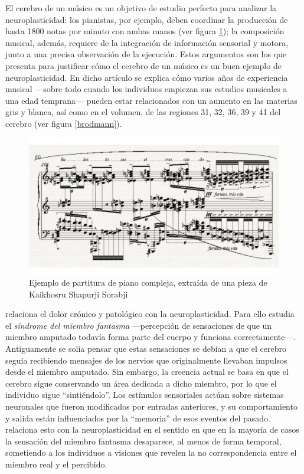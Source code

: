 El cerebro de un músico es un objetivo de estudio perfecto para analizar la neuroplasticidad: los pianistas, por ejemplo, deben coordinar la producción de hasta 1800 notas por minuto con ambas manos (ver figura \ref{fig::partitura}); la composición musical, además, requiere de la integración de información sensorial y motora, junto a una precisa observación de la ejecución. Estos argumentos son los que presenta \cite{Munte2002} para justificar cómo el cerebro de un músico es un buen ejemplo de neuroplasticidad. En dicho artículo se explica cómo varios años de experiencia musical ---sobre todo cuando los individuos empiezan sus estudios musicales a una edad temprana--- pueden estar relacionados con un aumento en las materias gris y blanca, así como en el volumen, de las regiones 31, 32, 36, 39 y 41 del cerebro (ver figura \ref{brodmann}).

\begin{figure}[h]
  \begin{center}
    \includegraphics[width=\textwidth]{images/piano.jpg}
    \caption{Ejemplo de partitura de piano compleja, extraída de una pieza de Kaikhosru Shapurji Sorabji}
    \label{fig::partitura}
  \end{center}
\end{figure}


\cite{Melzack2001} relaciona el dolor crónico y patológico con la neuroplasticidad. Para ello estudia el {\it síndrome del miembro fantasma} ---percepción de sensaciones de que un miembro amputado todavía forma parte del cuerpo y funciona correctamente---. Antiguamente se solía pensar que estas sensaciones se debían a que el cerebro seguía recibiendo mensajes de los nervios que originalmente llevaban impulsos desde el miembro amputado. Sin embargo, la creencia actual se basa en que el cerebro sigue conservando un área dedicada a dicho miembro, por lo que el individuo sigue ``sintiéndolo''. Los estímulos sensoriales actúan sobre sistemas neuronales que fueron modificados por entradas anteriores, y su comportamiento y salida están influenciados por la ``memoria'' de esos eventos del pasado. \cite{Melzack2001} relaciona esto con la neuroplasticidad en el sentido en que en la mayoría de casos la sensación del miembro fantasma desaparece, al menos de forma temporal, sometiendo a los individuos a visiones que revelen la no correspondencia entre el miembro real y el percibido.

